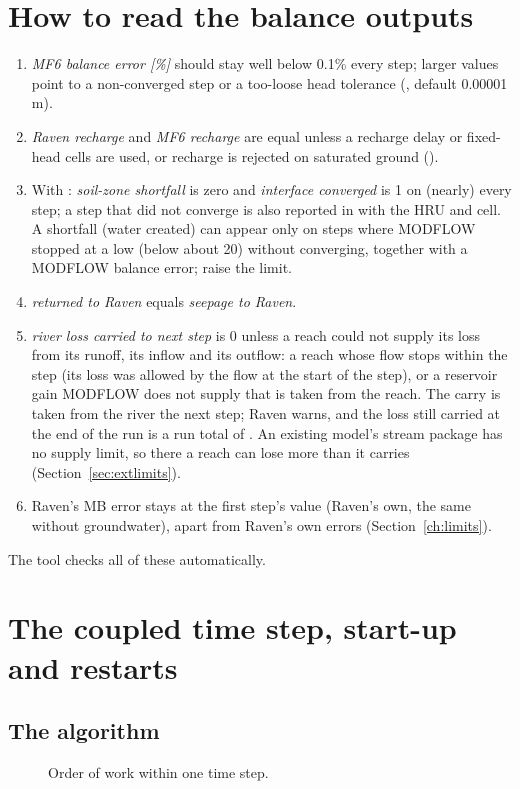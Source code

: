 \section{How to read the balance outputs}
\begin{enumerate}
\item \emph{MF6 balance error [\%]} should stay well below 0.1\% every step; larger values point to a non-converged step or a
too-loose head tolerance (, default 0.00001 m).
\item \emph{Raven recharge} and \emph{MF6 recharge} are equal unless a recharge delay or fixed-head cells are used, or
recharge is rejected on saturated ground ().
\item With : \emph{soil-zone shortfall} is zero and \emph{interface converged} is 1 on (nearly) every
step; a step that did not converge is also reported in  with the HRU and cell. A shortfall
(water created) can appear only on steps where MODFLOW stopped at a low  (below about
20) without converging, together with a MODFLOW balance error; raise the limit.
\item \emph{returned to Raven} equals \emph{seepage to Raven}.
\item \emph{river loss carried to next step} is 0 unless a reach could not supply its loss from its runoff, its inflow and
its outflow: a reach whose flow stops within the step (its loss was allowed by the flow at the start of the step), or a
reservoir gain MODFLOW does not supply that is taken from the reach. The carry is taken from the river the next step;
Raven warns, and the loss still carried at the end of the run is a run total of . An existing
model's stream package has no supply limit, so there a reach can lose more than it carries (Section~\ref{sec:extlimits}).
\item Raven's  MB error stays at the first step's value (Raven's own, the same
without groundwater), apart from Raven's own errors (Section~\ref{ch:limits}).
\end{enumerate}
The tool  checks all of these automatically.

\section{The coupled time step, start-up and restarts}\label{ch:timestep}
\subsection{The algorithm}
\begin{figure}[!htbp]\centering

\caption{Order of work within one time step.}\label{fig:timeline}
\end{figure}


